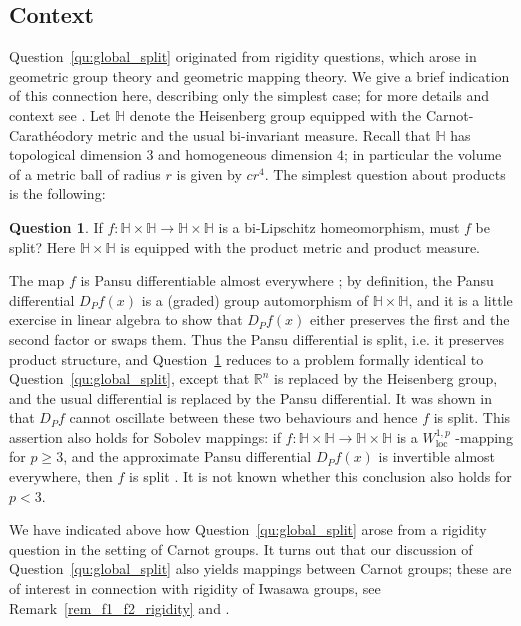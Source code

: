\documentclass[titlepage]{amsart}
\numberwithin{equation}{section}
\theoremstyle{plain}
\theoremstyle{definition}
\newtheorem{question}[equation]{Question}
\theoremstyle{remark}
\renewcommand{\H}{\mathbb{H}}
\newcommand{\loc}{\operatorname{loc}}
\newcommand{\R}{\mathbb{R}}
\newcommand{\ra}{\rightarrow}
\begin{document}
\subsection{Context}
Question~\ref{qu:global_split} originated from rigidity questions, which arose in geometric group theory and geometric mapping theory.  We give a brief indication of this connection here, describing only the simplest case; for more details and context see \cite{KMX1new}. Let $\H$ denote the Heisenberg group equipped with the Carnot-Carath\'eodory metric and the usual bi-invariant  measure. Recall that $\H$ has topological dimension $3$ and homogeneous dimension $4$; in particular the volume of a metric ball of radius $r$ is given by $c r^4$.  The simplest question about products is the following:


\begin{question}
\label{que_heisenberg_product}
 If $f:\H\times\H\ra \H\times\H$ is a bi-Lipschitz homeomorphism, must $f$ be split?  
 Here $\H \times \H$ is equipped with the product metric and product measure.
\end{question}

\noindent
The map $f$ is Pansu differentiable almost everywhere \cite{pansu};  by definition, the Pansu differential $D_P f(x)$
is a (graded) group automorphism of $\H \times \H$,  and it is a little exercise in linear algebra to show that $D_P f(x)$ either preserves the first and the second factor or swaps them.  Thus the Pansu differential is split, i.e. it preserves product structure, and Question~\ref{que_heisenberg_product} reduces to a problem formally identical to Question~\ref{qu:global_split}, except that $\R^n$ is replaced by the Heisenberg group, and the usual differential is replaced by the Pansu differential.
It was shown in  \cite{KMX1new} that $D_P f$ cannot oscillate between these two behaviours and hence $f$ is split. 
This assertion also holds for Sobolev mappings: if $f:\H\times \H\ra \H\times \H$ is a $W^{1,p}_{\loc}$ 
-mapping for $p\geq 3$, and the approximate Pansu differential $D_Pf(x)$ is invertible almost everywhere, then $f$ is split \cite{kmx_approximation_low_p}.  It is not known whether this conclusion also holds for $p < 3$.

\smallskip

We have indicated above how Question~\ref{qu:global_split} arose from a rigidity question in the setting of Carnot groups.  It turns out that 
our discussion of Question~\ref{qu:global_split} also yields mappings between  Carnot groups;  these are of  interest in connection with rigidity of Iwasawa groups, see Remark~\ref{rem_f1_f2_rigidity} and \cite{kmx_iwasawa}. 
\end{document}
